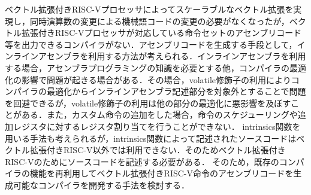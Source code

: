 ベクトル拡張付きRISC-Vプロセッサによってスケーラブルなベクトル拡張を実現し，同時演算数の変更による機械語コードの変更の必要がなくなったが，ベクトル拡張付きRISC-Vプロセッサが対応している命令セットのアセンブリコード等を出力できるコンパイラがない．アセンブリコードを生成する手段として，インラインアセンブラを利用する方法が考えられる．インラインアセンブラを利用する場合，アセンブラプログラミングの知識を必要とする他，コンパイラの最適化の影響で問題が起きる場合がある．その場合，volatile修飾子の利用によりコンパイラの最適化からインラインアセンブラ記述部分を対象外とすることで問題を回避できるが，volatile修飾子の利用は他の部分の最適化に悪影響を及ぼすことがある．また，カスタム命令の追加をした場合，命令のスケジューリングや追加レジスタに対するレジスタ割り当てを行うことができない．
intrinsics関数を用いる手法も考えられるが，intrinsics関数によって記述されたソースコードはベクトル拡張付きRISC-V以外では利用できない．そのためベクトル拡張付きRISC-Vのためにソースコードを記述する必要がある．
そのため，既存のコンパイラの機能を再利用してベクトル拡張付きRISC-V命令のアセンブリコードを生成可能なコンパイラを開発する手法を検討する．